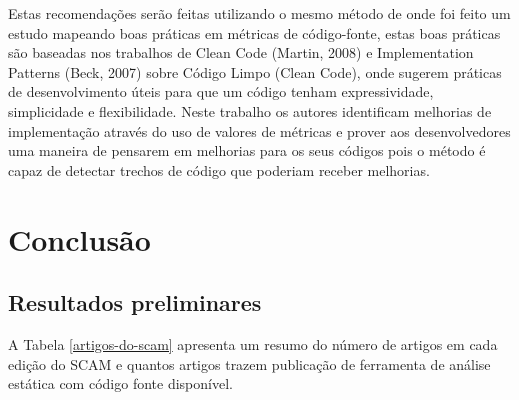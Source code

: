 \documentclass[qual, classic, a4paper]{ufbathesis}
\begin{document}
Estas recomendações serão feitas utilizando o mesmo método de
 onde foi feito um estudo mapeando boas práticas em
métricas de código-fonte, estas boas práticas são baseadas nos trabalhos de
Clean Code (Martin, 2008) e Implementation Patterns (Beck, 2007) sobre Código
Limpo (Clean Code), onde sugerem práticas de desenvolvimento úteis para que um
código tenham expressividade, simplicidade e flexibilidade. Neste trabalho os
autores identificam melhorias de implementação através do uso de valores de
métricas e prover aos desenvolvedores uma maneira de pensarem em melhorias
para os seus códigos pois o método é capaz de detectar trechos de código que
poderiam receber melhorias.

\chapter{Conclusão}

\section{Resultados preliminares}\label{resultados}

A Tabela \ref{artigos-do-scam} apresenta um resumo do número de artigos em
cada edição do SCAM e quantos artigos trazem publicação de ferramenta de análise
estática com código fonte disponível.
\end{document}
